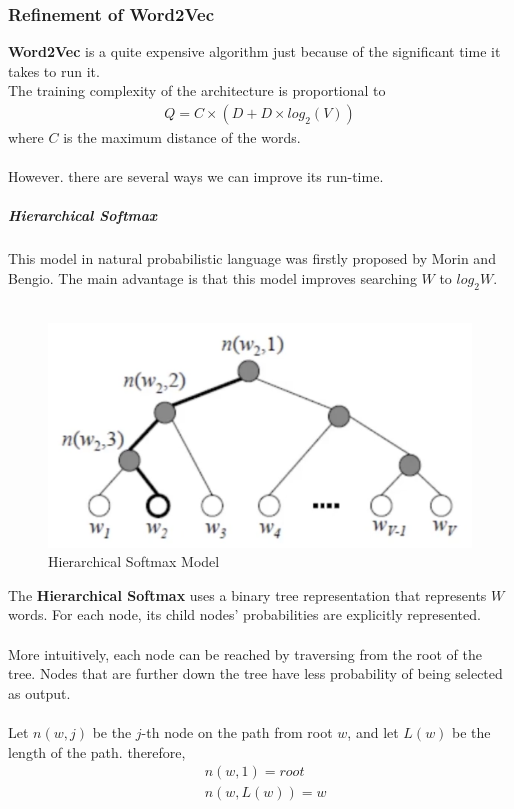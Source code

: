 \documentclass[paper=a4, fontsize=12pt]{scrartcl}
\begin{document}
\subsubsection{Refinement of Word2Vec}
\textbf{Word2Vec} is a quite expensive algorithm just because of the significant time it takes to run it. \\
The training complexity of the architecture is proportional to  
\begin{align*}
Q = C \times (D + D \times log_2(V ))
\end{align*}
where $C$ is the maximum distance of the words.\\\\
However. there are several ways we can improve its run-time.
\subparagraph{Hierarchical Softmax}
This model in natural probabilistic language was firstly proposed by Morin and Bengio. The main advantage is that this model improves searching $W$ to $log_2{W}$.\\\\
 \begin{figure}
  \includegraphics[scale=1]{softmax.png}
  \caption{Hierarchical Softmax Model}
  \label{fig:skip-gram}
\end{figure}
The \textbf{Hierarchical Softmax} uses a binary tree representation that represents $W$ words. For each node, its child nodes' probabilities are explicitly represented. \\\\
More intuitively, each node can be reached by traversing from the root of the tree. Nodes that are further down the tree have less probability of being selected as output. \\\\
Let $n(w, j)$ be the $j$-th node on the path from root $w$, and let $L(w)$ be the length of the path. therefore,
\begin{align*}
& n(w, 1) = root \\
& n(w, L(w)) = w
\end{align*}
\end{document}
